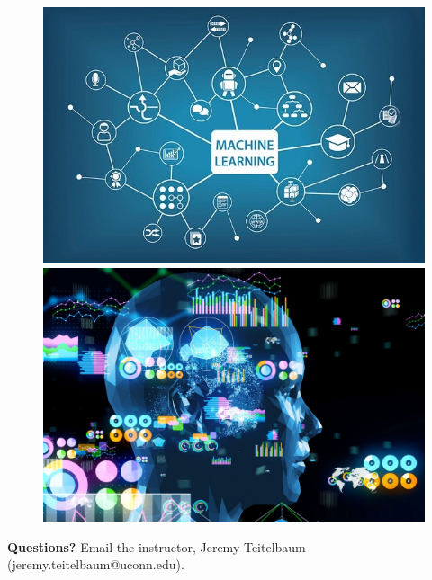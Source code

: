 \documentclass[12pt,letterpaper]{amsart}
\theoremstyle{plain}
\theoremstyle{definition}
\numberwithin{equation}{section}
\begin{document}
\begin{figure}[ht]
   \center
   \includegraphics[scale=.35]{ml.jpeg} \hspace{1cm}      \includegraphics[scale=.105]{ml-2.jpeg}  
\end{figure}



{\bf Questions?} Email the instructor, Jeremy Teitelbaum (jeremy.teitelbaum@uconn.edu).
\end{document}
